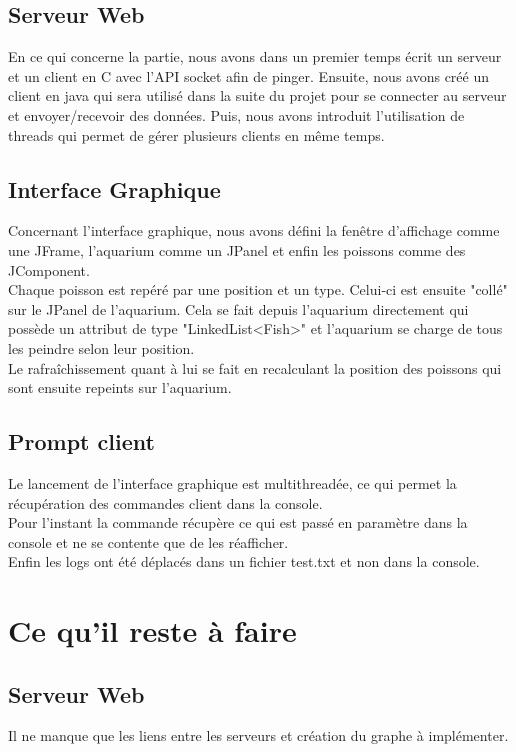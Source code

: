 \documentclass[a4paper,11pts]{article}
\begin{document}
\subsection{Serveur Web}
En ce qui concerne la partie, nous avons dans un premier temps écrit un serveur et un client en C avec l'API socket afin de pinger. Ensuite, nous avons créé un client en java qui sera utilisé dans la suite du projet pour se connecter au serveur et envoyer/recevoir des données. Puis, nous avons introduit l'utilisation de threads qui permet de gérer plusieurs clients en m\^eme temps.



\subsection{Interface Graphique}
Concernant l'interface graphique, nous avons défini la fenêtre d'affichage comme une JFrame, l'aquarium comme un JPanel et enfin les poissons comme des JComponent. \\
Chaque poisson est repéré par une position et un type. Celui-ci est ensuite "collé" sur le JPanel de l'aquarium. Cela se fait depuis l'aquarium directement qui possède un attribut de type "LinkedList<Fish>" et l'aquarium se charge de tous les peindre selon leur position. \\
Le rafraîchissement quant à lui se fait en recalculant la position des poissons qui sont ensuite repeints sur l'aquarium.
\subsection{Prompt client}
Le lancement de l'interface graphique est multithreadée, ce qui permet la récupération des commandes client dans la console. \\
Pour l'instant la commande récupère ce qui est passé en paramètre dans la console et ne se contente que de les réafficher.\\
Enfin les logs ont été déplacés dans un fichier test.txt et non dans la console.
\section{Ce qu'il reste à faire}

\subsection{Serveur Web}

Il ne manque que les liens entre les serveurs et création du graphe à implémenter.
\end{document}
